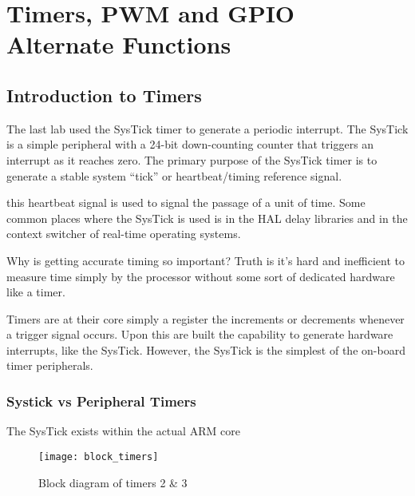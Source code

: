 \documentclass[11pt,fleqn]{book} %
\begin{document}
	
\chapter{Timers, PWM and GPIO Alternate Functions}

\section{Introduction to Timers}
The last lab used the SysTick timer to generate a periodic interrupt. The SysTick is a simple peripheral with a 24-bit down-counting counter that triggers an interrupt as it reaches zero. The primary purpose of the SysTick timer is to generate a stable system ``tick'' or heartbeat/timing reference signal. 

this heartbeat signal is used to signal the passage of a unit of time. Some common places where the SysTick is used is in the HAL delay libraries and in the context switcher of real-time operating systems. 

Why is getting accurate timing so important? Truth is it's hard and inefficient to measure time simply by the processor without some sort of dedicated hardware like a timer. 

Timers are at their core simply a register the increments or decrements whenever a trigger signal occurs. Upon this are built the capability to generate hardware interrupts, like the SysTick. However, the SysTick is the simplest of the on-board timer peripherals.

    
    \subsection{Systick vs Peripheral Timers}
     The SysTick exists within the actual ARM core 
    
%        
        \begin{figure}[]
            \centering\texttt{[image: block\_timers]}
            \caption{Block diagram of timers 2 \& 3}
            \label{block_timers}
        \end{figure}
        
\end{document}

